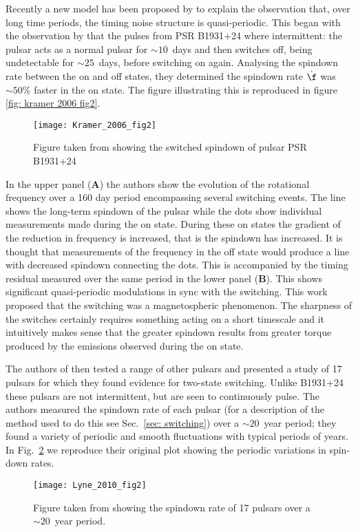 Recently a new model has been proposed by \citet{Lyne2010} to explain the
observation that, over long time periods, the timing noise structure is
quasi-periodic. This began with the observation by \citet{Kramer2006} that the
pulses from PSR B1931+24 where intermittent: the pulsar acts as a normal pulsar
for $\sim10$~days and then switches off, being undetectable for $\sim25$~days,
before switching on again. Analysing the spindown rate between the on and off
states, they determined the spindown rate $\dot{\f}$ was $\sim50\%$ faster in
the on state. The figure illustrating this is reproduced in figure \ref{fig:
kramer 2006 fig2}.
\begin{figure}
    \centering
    \texttt{[image: Kramer\_2006\_fig2]}
    \caption{Figure taken from \citet{Kramer2006} showing the switched spindown
             of pulsar PSR B1931+24}
    \label{fig: kramer 2006 fig2}
\end{figure}
In the  upper panel (\textbf{A}) the authors show the evolution of the
rotational frequency over a 160 day period encompassing several switching
events. The line shows the long-term spindown of the pulsar while the dots show
individual measurements made during the on state. During these on states the
gradient of the reduction in frequency is increased, that is the spindown has
increased. It is thought that measurements of the frequency in the off state
would produce a line with decreased spindown connecting the dots. This is
accompanied by the timing residual measured over the same period in the lower
panel (\textbf{B}). This shows significant quasi-periodic modulations in sync
with the switching. This work proposed that the switching was a magnetospheric
phenomenon. The sharpness of the switches certainly requires something acting
on a short timescale and it intuitively makes sense that the greater spindown
results from greater torque produced by the emissions observed during the on
state.

The authors of \citet{Lyne2010} then tested a range of other pulsars and
presented a study of 17 pulsars for which they found evidence for two-state
switching. Unlike B1931+24 these pulsars are not intermittent, but are seen to
continuously pulse.
The authors measured the spindown rate of each pulsar (for a description of the
method used to do this see Sec.~\ref{sec: switching}) over a
$\sim20$~year period; they found a variety of periodic and smooth fluctuations
with typical periods of years. In Fig.~\ref{fig: lyne 2010 fig2} we reproduce
their original plot showing the periodic variations in spin-down rates.
\begin{figure}
    \centering
    \texttt{[image: Lyne\_2010\_fig2]}
    \caption{Figure taken from \citet{Lyne2010} showing the spindown rate
             of 17 pulsars over a $\sim20$~year period.}
    \label{fig: lyne 2010 fig2}
\end{figure}

